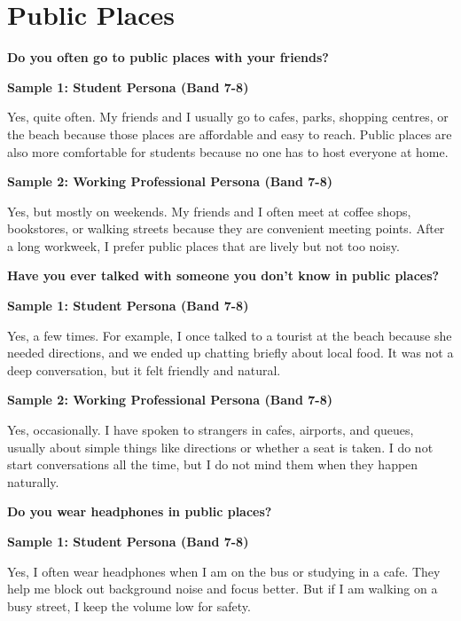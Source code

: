 \newpage

\section{Public Places}
\begin{ieltsquestion}
\textbf{Do you often go to public places with your friends?}
\end{ieltsquestion}
\textbf{Sample 1: Student Persona (Band 7-8)}

Yes, quite often. My friends and I usually go to cafes, parks, shopping centres, or the beach because those places are affordable and easy to reach. Public places are also more comfortable for students because no one has to host everyone at home.

\textbf{Sample 2: Working Professional Persona (Band 7-8)}

Yes, but mostly on weekends. My friends and I often meet at coffee shops, bookstores, or walking streets because they are convenient meeting points. After a long workweek, I prefer public places that are lively but not too noisy.

\separator

\begin{ieltsquestion}
\textbf{Have you ever talked with someone you don't know in public places?}
\end{ieltsquestion}
\textbf{Sample 1: Student Persona (Band 7-8)}

Yes, a few times. For example, I once talked to a tourist at the beach because she needed directions, and we ended up chatting briefly about local food. It was not a deep conversation, but it felt friendly and natural.

\textbf{Sample 2: Working Professional Persona (Band 7-8)}

Yes, occasionally. I have spoken to strangers in cafes, airports, and queues, usually about simple things like directions or whether a seat is taken. I do not start conversations all the time, but I do not mind them when they happen naturally.

\separator

\begin{ieltsquestion}
\textbf{Do you wear headphones in public places?}
\end{ieltsquestion}
\textbf{Sample 1: Student Persona (Band 7-8)}

Yes, I often wear headphones when I am on the bus or studying in a cafe. They help me block out background noise and focus better. But if I am walking on a busy street, I keep the volume low for safety.

